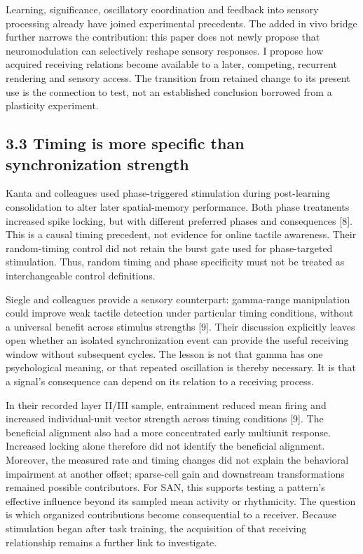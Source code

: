 \documentclass[
  american,
  11pt,
  letterpaper,
]{article}
\begin{document}
Learning, significance, oscillatory coordination and feedback into sensory processing already have joined experimental precedents. The added in vivo bridge further narrows the contribution: this paper does not newly propose that neuromodulation can selectively reshape sensory responses. I propose how acquired receiving relations become available to a later, competing, recurrent rendering and sensory access. The transition from retained change to its present use is the connection to test, not an established conclusion borrowed from a plasticity experiment.

\subsection{3.3 Timing is more specific than synchronization strength}\label{timing-is-more-specific-than-synchronization-strength}

Kanta and colleagues used phase-triggered stimulation during post-learning consolidation to alter later spatial-memory performance. Both phase treatments increased spike locking, but with different preferred phases and consequences {[}8{]}. This is a causal timing precedent, not evidence for online tactile awareness. Their random-timing control did not retain the burst gate used for phase-targeted stimulation. Thus, random timing and phase specificity must not be treated as interchangeable control definitions.

Siegle and colleagues provide a sensory counterpart: gamma-range manipulation could improve weak tactile detection under particular timing conditions, without a universal benefit across stimulus strengths {[}9{]}. Their discussion explicitly leaves open whether an isolated synchronization event can provide the useful receiving window without subsequent cycles. The lesson is not that gamma has one psychological meaning, or that repeated oscillation is thereby necessary. It is that a signal's consequence can depend on its relation to a receiving process.

In their recorded layer II/III sample, entrainment reduced mean firing and increased individual-unit vector strength across timing conditions {[}9{]}. The beneficial alignment also had a more concentrated early multiunit response. Increased locking alone therefore did not identify the beneficial alignment. Moreover, the measured rate and timing changes did not explain the behavioral impairment at another offset; sparse-cell gain and downstream transformations remained possible contributors. For SAN, this supports testing a pattern's effective influence beyond its sampled mean activity or rhythmicity. The question is which organized contributions become consequential to a receiver. Because stimulation began after task training, the acquisition of that receiving relationship remains a further link to investigate.
\end{document}
